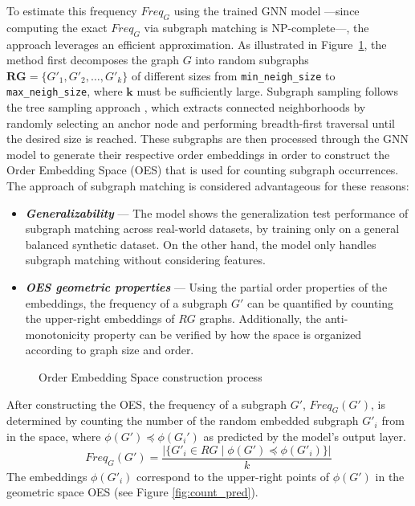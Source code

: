 \documentclass[preprint,12pt]{elsarticle}
\theoremstyle{plain}
\theoremstyle{definition}
\theoremstyle{remark}
\begin{document}
To estimate this frequency $Freq_G$ using the trained GNN model —since computing the exact $Freq_G$ via subgraph matching is NP-complete—, the approach leverages an efficient approximation. As illustrated in Figure~\ref{fig:encoder_process}, the method first decomposes the graph $G$ into random subgraphs $\bm{RG}=\{G'_1, G'_2, \dots, G'_k\}$ of different sizes from \texttt{min\_neigh\_size} to \texttt{max\_neigh\_size}, where $\bm{k}$ must be sufficiently large. Subgraph sampling follows the tree sampling approach \cite{kashtan2004efficient}, which extracts connected neighborhoods by randomly selecting an anchor node and performing breadth-first traversal until the desired size is reached. These subgraphs are then processed through the GNN model to generate their respective order embeddings in order to construct the Order Embedding Space (OES) that is used for counting subgraph occurrences. The approach of subgraph matching is considered advantageous for these reasons:

\begin{itemize}
    \item \textbf{\textit{Generalizability}} --- The model shows the generalization test performance of subgraph matching across real-world datasets, by training only on a general balanced synthetic dataset. On the other hand, the model only handles subgraph matching without considering features.
    \item \textbf{\textit{OES geometric properties}} --- Using the partial order properties of the embeddings, the frequency of a subgraph $G'$ can be quantified by counting the upper-right embeddings of $RG$ graphs. Additionally, the anti-monotonicity property can be verified by how the space is organized according to graph size and order.
\end{itemize}

\begin{figure}[htbp]
    \centering
    \resizebox{0.9\linewidth}{!}{}
    \caption{Order Embedding Space construction process}
    \label{fig:encoder_process}
\end{figure}

After constructing the OES, the frequency of a subgraph \( G' \), $Freq_G(G')$, is determined by counting the number of the random embedded subgraph \( G'_i \) from  in the space, where \( \phi(G') \preceq \phi(G_i') \) as predicted by the model's output layer.
\textbf{\[Freq_G(G')=\frac{|\{G'_i \in RG \mid \phi(G') \preceq \phi(G'_i)\}|}{k}\]}
The embeddings $\phi(G'_i)$ correspond to the upper-right points of $\phi(G')$ in the geometric space OES (see Figure \ref{fig:count_pred}).
\end{document}
